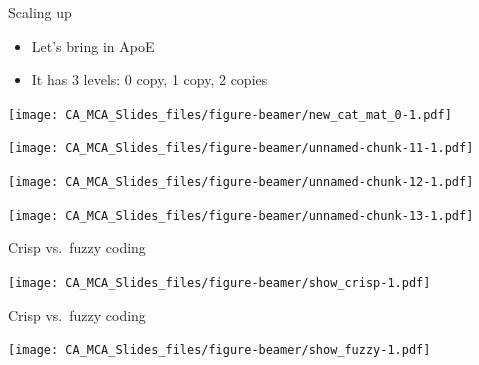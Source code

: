 \documentclass[
  ignorenonframetext,
]{beamer}
\providecommand{\tightlist}{%
  \setlength{\itemsep}{0pt}\setlength{\parskip}{0pt}}
\begin{document}
\begin{frame}{Scaling up}
\protect\hypertarget{scaling-up}{}

\begin{itemize}[<+->]
\tightlist
\item
  Let's bring in ApoE
\item
  It has 3 levels: 0 copy, 1 copy, 2 copies
\end{itemize}

\end{frame}

\begin{frame}

\texttt{[image: CA\_MCA\_Slides\_files/figure-beamer/new\_cat\_mat\_0-1.pdf]}

\end{frame}

\begin{frame}

\texttt{[image: CA\_MCA\_Slides\_files/figure-beamer/unnamed-chunk-11-1.pdf]}

\end{frame}

\begin{frame}

\texttt{[image: CA\_MCA\_Slides\_files/figure-beamer/unnamed-chunk-12-1.pdf]}

\end{frame}

\begin{frame}

\texttt{[image: CA\_MCA\_Slides\_files/figure-beamer/unnamed-chunk-13-1.pdf]}

\end{frame}

\begin{frame}{Crisp vs.~fuzzy coding}
\protect\hypertarget{crisp-vs.-fuzzy-coding}{}

\texttt{[image: CA\_MCA\_Slides\_files/figure-beamer/show\_crisp-1.pdf]}

\end{frame}

\begin{frame}{Crisp vs.~fuzzy coding}
\protect\hypertarget{crisp-vs.-fuzzy-coding-1}{}

\texttt{[image: CA\_MCA\_Slides\_files/figure-beamer/show\_fuzzy-1.pdf]}

\end{frame}
\end{document}

